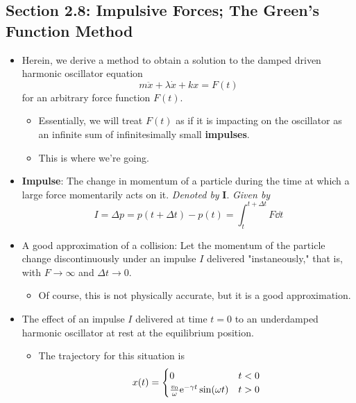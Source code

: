 \documentclass[../notes.tex]{subfiles}
\begin{document}
\subsection*{Section 2.8: Impulsive Forces; The Green's Function Method}
\begin{itemize}
    \item Herein, we derive a method to obtain a solution to the damped driven harmonic oscillator equation
    \begin{equation*}
        m\ddot{x}+\lambda\dot{x}+kx = F(t)
    \end{equation*}
    for an arbitrary force function $F(t)$.
    \begin{itemize}
        \item Essentially, we will treat $F(t)$ as if it is impacting on the oscillator as an infinite sum of infinitesimally small \textbf{impulses}.
        \item This is where we're going.
    \end{itemize}
    \item \textbf{Impulse}: The change in momentum of a particle during the time at which a large force momentarily acts on it. \emph{Denoted by} $\bm{I}$. \emph{Given by}
    \begin{equation*}
        I = \Delta p
        = p(t+\Delta t)-p(t)
        = \int_t^{t+\Delta t}F\dd{t}
    \end{equation*}
    \item A good approximation of a collision: Let the momentum of the particle change discontinuously under an impulse $I$ delivered "instaneously," that is, with $F\to\infty$ and $\Delta t\to 0$.
    \begin{itemize}
        \item Of course, this is not physically accurate, but it is a good approximation.
    \end{itemize}
    \item The effect of an impulse $I$ delivered at time $t=0$ to an underdamped harmonic oscillator at rest at the equilibrium position.
    \begin{itemize}
        \item The trajectory for this situation is
        \begin{equation*}
            x(t) =
            \begin{cases}
                0 & t<0\\
                \frac{v_0}{\omega}\e[-\gamma t]\sin(\omega t) & t>0
            \end{cases}

\end{equation*}
\end{itemize}
\end{itemize}
\end{document}

